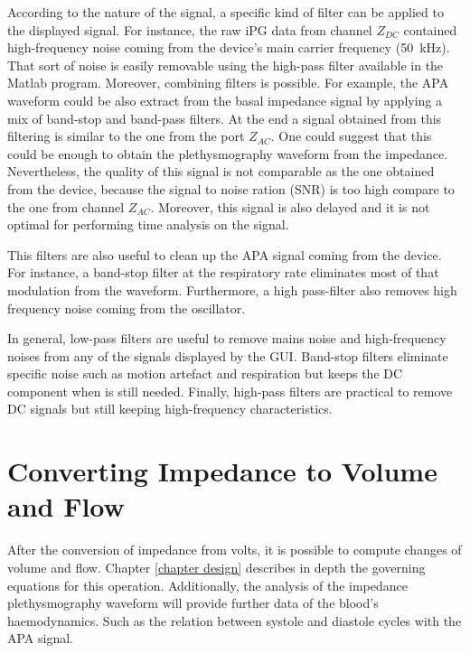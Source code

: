 According to the nature of the signal, a specific kind of filter can be applied to the displayed signal. For instance, the raw iPG data from channel $Z_{DC}$ contained high-frequency noise coming from the device's main carrier frequency (\SI{50}{\kilo\hertz}). That sort of noise is easily removable using the high-pass filter available in the Matlab program. Moreover, combining filters is possible. For example, the APA waveform could be also extract from the basal impedance signal by applying a mix of band-stop and band-pass filters. At the end a signal obtained from this filtering is similar to the one from the port $Z_{AC}$. One could suggest that this could be enough to obtain the plethysmography waveform from the impedance. Nevertheless, the quality of this signal is not comparable as the one obtained from the device, because the signal to noise ration (SNR)  is too high compare to the one from channel $Z_{AC}$. Moreover, this signal is also delayed and it is not optimal for performing time analysis on the signal. 

This filters are also useful to clean up the APA signal coming from the device. For instance, a band-stop filter at the respiratory rate eliminates most of that modulation from the waveform. Furthermore, a high pass-filter also removes high frequency noise coming from the oscillator.

In general, low-pass filters are useful to remove mains noise and high-frequency noises from any of the signals displayed by the GUI. Band-stop filters eliminate specific noise such as motion artefact and respiration but keeps the DC component when is still needed. Finally, high-pass filters are practical to remove DC signals but still keeping high-frequency characteristics.


\section{Converting Impedance to Volume and Flow}
\label{section procedure Z to V and Q}

After the conversion of impedance from volts, it is possible to compute changes of volume and flow. Chapter \ref{chapter design} describes in depth the governing equations for this operation. Additionally, the analysis of the impedance plethysmography waveform will provide further data of the blood's haemodynamics. Such as the relation between systole and diastole cycles with the APA signal.

